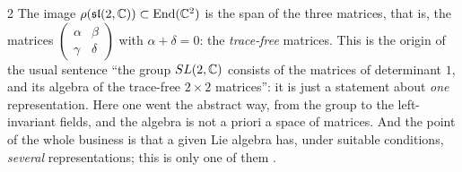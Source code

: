 \begin{paracol}{2}
The image $\rho(\mathfrak{sl}(2,\mathbb{C}))\subset\mathrm{End}(\mathbb{C}^2)$ is the span of the three matrices, that is, the matrices $\begin{pmatrix}\alpha&\beta\\\gamma&\delta\end{pmatrix}$ with $\alpha+\delta=0$: the \emph{trace-free} matrices. This is the origin of the usual sentence ``the group $SL(2,\mathbb{C})$ consists of the matrices of determinant $1$, and its algebra of the trace-free $2\times2$ matrices'': it is just a statement about \emph{one} representation. Here one went the abstract way, from the group to the left-invariant fields, and the algebra is not a priori a space of matrices. And the point of the whole business is that a given Lie algebra has, under suitable conditions, \emph{several} representations; this is only one of them   .


\end{paracol}
